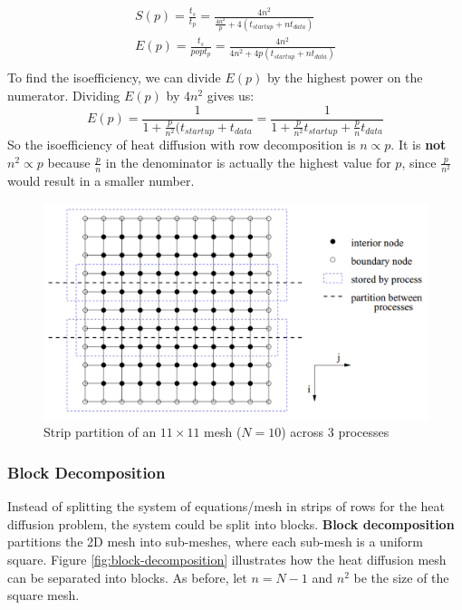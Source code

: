 \documentclass{article}
\begin{document}
\begin{multline} \\
	S(p) = \frac{t_s}{t_p} = \frac{4n^2}{\frac{4n^2}{p} + 4(t_{startup} + nt_{data})} \\
	E(p) = \frac{t_s}{popt_p} = \frac{4n^2}{4n^2 + 4p(t_{startup} + nt_{data})}
	\\
	\label {eq:row-decomp-heat-speedup-efficiency}
\end{multline}
To find the isoefficiency, we can divide $E(p)$ by the highest power on the numerator. Dividing $E(p)$ by $4n^2$ gives us:
\begin{equation}
	E(p) = \frac{1}{1 + \frac{p}{n^2}(t_{startup} + t_{data}} = \frac{1}{1 + \frac{p}{n^2}t_{startup} + \frac{p}{n}t_{data}}
	\label {eq:row-decomp-heat-isoefficiency}
\end{equation}
So the isoefficiency of heat diffusion with row decomposition is $n \propto p$. It is \textbf{not} $n^2 \propto p$ because $\frac{p}{n}$ in the denominator is actually the highest value for $p$, since $\frac{p}{n^2}$ would result in a smaller number.

\begin{figure}
	\centering
	\includegraphics[scale=0.4]{figures/strip-decomposition.png}
	\caption{Strip partition of an $11 \times 11$ mesh ($N = 10$) across 3 processes}
	\label{fig:strip-decomposition}
\end{figure}

\subsubsection{Block Decomposition}

Instead of splitting the system of equations/mesh in strips of rows for the heat diffusion problem, the system could be split into blocks. \textbf{Block decomposition} partitions the 2D mesh into sub-meshes, where each sub-mesh is a uniform square. Figure \ref{fig:block-decomposition} illustrates how the heat diffusion mesh can be separated into blocks. As before, let $n = N - 1$ and $n^2$ be the size of the square mesh.
\end{document}
